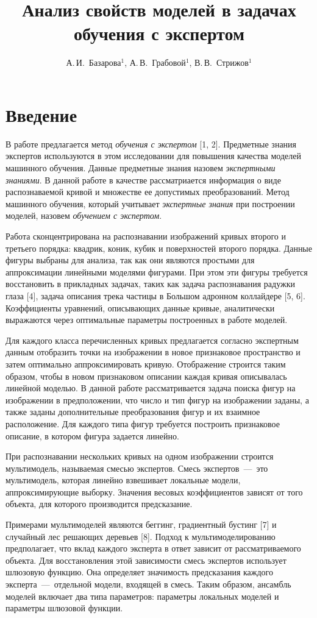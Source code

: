 \documentclass[12pt,twoside]{article}
\title{Анализ свойств моделей в задачах обучения с экспертом}
\author{А.\,И.~Базарова$^1$, А.\,В.~Грабовой$^1$, В.\,В.~Стрижов$^1$} %
\begin{document}
\maketitle
\linenumbers
\section{Введение}
В работе предлагается метод \textit{обучения с экспертом} [1, 2]. 
Предметные знания экспертов используются в этом исследовании для повышения качества моделей машинного обучения.
Данные предметные знания назовем \textit{экспертными знаниями}. В данной работе в качестве   рассматриается информация о виде распознаваемой кривой и множестве ее допустимых преобразований. Метод машинного обучения, который учитывает \textit{экспертные знания} при построении моделей, назовем \textit{обучением с экспертом}. 

Работа сконцентрирована на распознавании изображений кривых второго и третьего порядка: квадрик, коник, кубик и поверхностей второго порядка. Данные фигуры выбраны для анализа, так как они являются простыми для аппроксимации линейными моделями фигурами. При этом эти фигуры требуется восстановить в прикладных задачах, таких как задача распознавания радужки глаза [4], задача описания трека частицы в Большом адронном коллайдере [5, 6]. Коэффициенты уравнений, описывающих данные кривые, аналитически выражаются через оптимальные параметры построенных в работе моделей.

Для каждого класса перечисленных кривых предлагается согласно экспертным данным отобразить точки на изображении в новое признаковое пространство и затем оптимально аппроксимировать кривую. Отображение строится таким образом, чтобы в новом признаковом описании каждая кривая описывалась линейной моделью. В данной работе рассматривается задача поиска фигур на изображении в предположении, что число и тип фигур на изображении заданы, а также заданы дополнительные преобразования фигур и их взаимное расположение. Для каждого типа фигур требуется построить признаковое описание, в котором фигура задается линейно. 

При распознавании нескольких кривых на одном изображении строится мультимодель, называемая смесью экспертов. Смесь экспертов~---~это мультимодель, которая линейно взвешивает локальные модели, аппроксимирующие выборку. Значения весовых коэффициентов зависят от того объекта, для которого производится предсказание. 

Примерами мультимоделей являются беггинг, градиентный бустинг [7] и случайный лес решающих деревьев [8]. Подход к мультимоделированию предполагает, что вклад каждого эксперта в ответ зависит от рассматриваемого объекта. Для восстановления этой зависимости смесь экспертов использует шлюзовую функцию. Она определяет значимость предсказания каждого эксперта~---~отдельной модели, входящей в смесь. Таким образом, ансамбль моделей включает два типа параметров: параметры локальных моделей и параметры шлюзовой функции.
\end{document}
